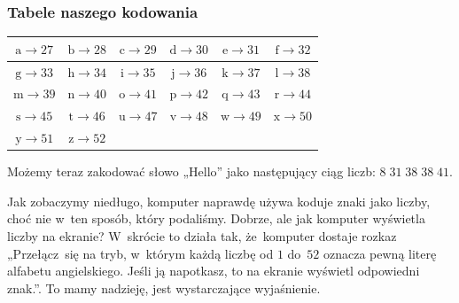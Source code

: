 \documentclass[10pt,t]{beamer}
\begin{document}
\begin{frame}
  \frametitle{Tabele naszego kodowania}


  \begin{center}

    \begin{tabular}{| c | c | c | c | c | c |}
      \hline
      $\text{a} \to 27$ & $\text{b} \to 28$ & $\text{c} \to 29$
      & $\text{d} \to 30$ & $\text{e} \to 31$ & $\text{f} \to 32$ \\
      \hline
      $\text{g} \to 33$ & $\text{h} \to 34$ & $\text{i} \to 35$
      & $\text{j} \to 36$ & $\text{k} \to 37$ & $\text{l} \to 38$ \\
      \hline
      $\text{m} \to 39$ & $\text{n} \to 40$ & $\text{o} \to 41$
      & $\text{p} \to 42$ & $\text{q} \to 43$ & $\text{r} \to 44$ \\
      \hline
      $\text{s} \to 45$ & $\text{t} \to 46$ & $\text{u} \to 47$
      & $\text{v} \to 48$ & $\text{w} \to 49$ & $\text{x} \to 50$ \\
      \hline
      $\text{y} \to 51$ & $\text{z} \to 52$ & & & & \\
      \hline
    \end{tabular}

  \end{center}

  Możemy teraz zakodować słowo „Hello” jako następujący ciąg liczb:
  $8 \; 31 \; 38 \; 38 \; 41$.

  Jak zobaczymy niedługo, komputer naprawdę
  używa koduje znaki jako liczby, choć nie w~ten sposób, który podaliśmy.
  Dobrze, ale jak komputer wyświetla liczby na ekranie? W~skrócie to działa
  tak, że~komputer dostaje rozkaz „Przełącz~się na tryb, w~którym każdą
  liczbę od $1$ do~$52$ oznacza pewną literę alfabetu angielskiego.
  Jeśli ją napotkasz, to na ekranie wyświetl odpowiedni znak.”. To mamy
  nadzieję, jest wystarczające wyjaśnienie.

\end{frame}
\end{document}
